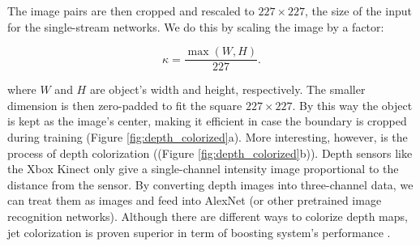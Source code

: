 The image pairs are then cropped and rescaled to $227 \times 227$, the size of the input for the single-stream networks. We do this by scaling the image by a factor:

\[ \kappa = \frac{\max(W, H)}{227}. \]

where $W$ and $H$ are object's width and height, respectively. The smaller dimension is then zero-padded to fit the square $227 \times 227$. By this way the object is kept as the image's center, making it efficient in case the boundary is cropped during training (Figure \ref{fig:depth_colorized}a). More interesting, however, is the process of depth colorization ((Figure \ref{fig:depth_colorized}b)). Depth sensors like the Xbox Kinect only give a single-channel intensity image proportional to the distance from the sensor. By converting depth images into three-channel data, we can treat them as images and feed into AlexNet (or other pretrained image recognition networks). Although there are different ways to colorize depth maps, jet colorization is proven superior in term of boosting system's performance \cite{Eitel2015}.

